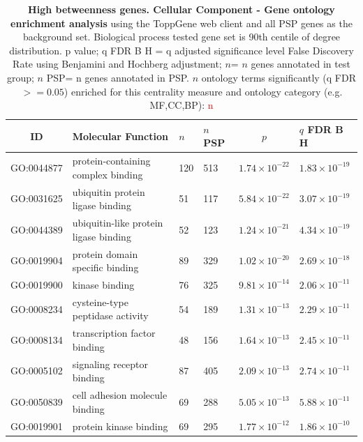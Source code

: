 \begin{table}[ht]
\centering
\begin{adjustbox}{width=\textwidth}
\setlength{\extrarowheight}{2pt}
\begin{tabular}{@{}clllcl@{}}
  \toprule
  ID & Molecular Function & $n$ & $n$ PSP & $p$ & $q$ FDR B H \\ 

  \midrule
GO:0044877 & protein-containing complex binding & 120 & 513 & $1.74 \times 10^{-22}$ & $1.83 \times 10^{-19}$ \\ 
  GO:0031625 & ubiquitin protein ligase binding & 51 & 117 & $5.84 \times 10^{-22}$ & $3.07 \times 10^{-19}$ \\ 
  GO:0044389 & ubiquitin-like protein ligase binding & 52 & 123 & $1.24 \times 10^{-21}$ & $4.34 \times 10^{-19}$ \\ 
  GO:0019904 & protein domain specific binding & 89 & 329 & $1.02 \times 10^{-20}$ & $2.69 \times 10^{-18}$ \\ 
  GO:0019900 & kinase binding & 76 & 325 & $9.81 \times 10^{-14}$ & $2.06 \times 10^{-11}$ \\ 
  GO:0008234 & cysteine-type peptidase activity & 54 & 189 & $1.31 \times 10^{-13}$ & $2.29 \times 10^{-11}$ \\ 
  GO:0008134 & transcription factor binding & 48 & 156 & $1.64 \times 10^{-13}$ & $2.45 \times 10^{-11}$ \\ 
  GO:0005102 & signaling receptor binding & 87 & 405 & $2.09 \times 10^{-13}$ & $2.74 \times 10^{-11}$ \\ 
  GO:0050839 & cell adhesion molecule binding & 69 & 288 & $5.05 \times 10^{-13}$ & $5.88 \times 10^{-11}$ \\ 
  GO:0019901 & protein kinase binding & 69 & 295 & $1.77 \times 10^{-12}$ & $1.86 \times 10^{-10}$ \\ 
   \bottomrule
\end{tabular}
\end{adjustbox}
\caption[Gene ontology enrichment High betweenness genes Molecular Function of genes above 90th centile of distribution]{\textbf{High betweenness genes. Cellular Component - Gene ontology enrichment analysis} using the ToppGene web client and all PSP genes as the background set.  Biological process tested gene set is 90th centile of degree distribution.  p value; q FDR B H = q adjusted significance level False Discovery Rate using Benjamini and Hochberg adjustment; $n$= $n$ genes annotated in test group; $n$ PSP= n genes annotated in PSP. $n$ ontology terms significantly (q FDR$>=0.05$) enriched for this centrality measure and ontology category (e.g. MF,CC,BP): \textcolor{red}{n}} 

\label{tab:ToppGENE GO: Molecular Function. bet 90 centile cwpsp.txtp = p value; q FDR B H = q adjusted significance level False Discovery Rate using Benjamini and Hochberg adjustment; n= n genes annotated in test group; n PSP= n genes annotated in PSP}
\end{table}

